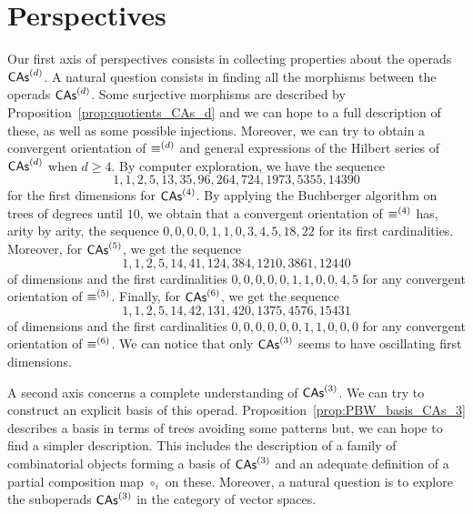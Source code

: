 \section*{Perspectives}
Our first axis of perspectives consists in collecting properties about
the operads $\mathsf{CAs}^{(d)}$. A natural question consists in finding all the
morphisms between the operads $\mathsf{CAs}^{(d)}$. Some surjective morphisms are
described by Proposition~\ref{prop:quotients_CAs_d} and we can hope to a
full description of these, as well as some possible injections.
Moreover, we can try to obtain a convergent orientation of
$\operatorname{\equiv}^{(d)}$ and general expressions of the Hilbert series of
$\mathsf{CAs}^{(d)}$ when $d \geq 4$. By computer exploration, we have the sequence
\begin{equation}
    1, 1, 2, 5, 13, 35, 96, 264, 724, 1973, 5355, 14390
\end{equation}
for the first dimensions for $\mathsf{CAs}^{(4)}$. By applying the Buchberger
algorithm on trees of degrees until $10$, we obtain that a convergent
orientation of $\operatorname{\equiv}^{(4)}$ has, arity by arity, the sequence
\begin{math}
    0, 0, 0, 0, 1, 1, 0, 3, 4, 5, 18, 22
\end{math}
for its first cardinalities. Moreover, for $\mathsf{CAs}^{(5)}$, we get the
sequence
\begin{equation}
    1, 1, 2, 5, 14, 41, 124, 384, 1210, 3861, 12440
\end{equation}
of dimensions and the first cardinalities
\begin{math}
    0, 0, 0, 0, 0, 1, 1, 0, 0, 4, 5
\end{math}
for any convergent orientation of $\operatorname{\equiv}^{(5)}$. Finally, for
$\mathsf{CAs}^{(6)}$, we get the sequence
\begin{equation}
    1, 1, 2, 5, 14, 42, 131, 420, 1375, 4576, 15431
\end{equation}
of dimensions and the first cardinalities
\begin{math}
    0, 0, 0, 0, 0, 0, 1, 1, 0, 0, 0
\end{math}
for any convergent orientation of $\operatorname{\equiv}^{(6)}$. We can notice that
only $\mathsf{CAs}^{(3)}$ seems to have oscillating first dimensions.
\medbreak

A second axis concerns a complete understanding of $\mathsf{CAs}^{(3)}$. We can
try to construct an explicit basis of this operad.
Proposition~\ref{prop:PBW_basis_CAs_3} describes a basis in terms of
trees avoiding some patterns but, we can hope to find a simpler
description. This includes the description of a family of combinatorial
objects forming a basis of $\mathsf{CAs}^{(3)}$ and an adequate definition of a
partial composition map $\circ_i$ on these. Moreover, a natural
question is to explore the suboperads $\mathsf{CAs}^{(3)}$ in the category of
vector spaces.
\medbreak

